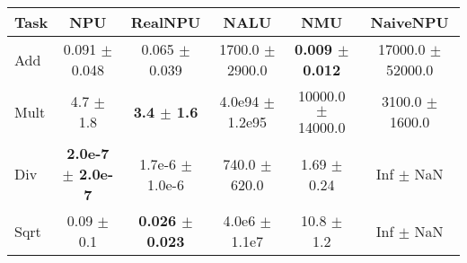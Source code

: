 \begin{tabular}{lccccc}
\toprule
Task & NPU & RealNPU & NALU & NMU & NaiveNPU\\
\midrule
Add  & 0.091 $\pm$ 0.048 & 0.065 $\pm$ 0.039 &1700.0 $\pm$ 2900.0 & \textbf{0.009 $\pm$ 0.012} & 17000.0 $\pm$ 52000.0 \\
Mult & 4.7 $\pm$ 1.8 & \textbf{3.4 $\pm$ 1.6} &4.0e94 $\pm$ 1.2e95 & 10000.0 $\pm$ 14000.0 & 3100.0 $\pm$ 1600.0 \\
Div  & \textbf{2.0e-7 $\pm$ 2.0e-7} & 1.7e-6 $\pm$ 1.0e-6 &740.0 $\pm$ 620.0 & 1.69 $\pm$ 0.24 & Inf $\pm$ NaN \\
Sqrt & 0.09 $\pm$ 0.1 & \textbf{0.026 $\pm$ 0.023} &4.0e6 $\pm$ 1.1e7 & 10.8 $\pm$ 1.2 & Inf $\pm$ NaN \\
\bottomrule
\end{tabular}
